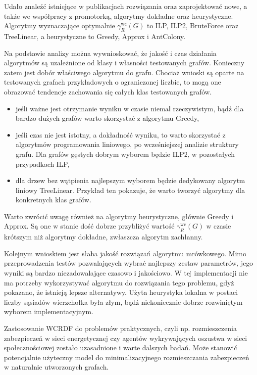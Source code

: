 Udało znaleźć istniejące w publikacjach rozwiązania oraz zaprojektować nowe, a także we współpracy z promotorką, algorytmy dokładne oraz heurystyczne. Algorytmy wyznaczające optymalnie $\gamma^{\text{wc}}_R(G)$ to ILP, ILP2, BruteForce oraz TreeLinear, a heurystyczne to Greedy, Approx i AntColony.

Na podstawie analizy można wywnioskować, że jakość i czas działania algorytmów są uzależnione od klasy i własności testowanych grafów. Konieczny zatem jest dobór właściwego algorytmu do grafu. Chociaż wnioski są oparte na testowanych grafach przykładowych o ograniczonej liczbie, to mogą one obrazować tendencje zachowania się całych klas testowanych grafów.
\begin{itemize}
    \item jeśli ważne jest otrzymanie wyniku w czasie niemal rzeczywistym, bądź dla bardzo dużych grafów warto skorzystać z algorytmu Greedy,
    \item jeśli czas nie jest istotny, a dokładność wyniku, to warto skorzystać z algorytmów programowania liniowego, po wcześniejszej analizie struktury grafu. Dla grafów gęstych dobrym wyborem będzie ILP2, w pozostałych przypadkach ILP,
    \item dla drzew bez wątpienia najlepszym wyborem będzie dedykowany algorytm liniowy TreeLinear. Przykład ten pokazuje, że warto tworzyć algorytmy dla konkretnych klas grafów.
\end{itemize}

Warto zwrócić uwagę również na algorytmy heurystyczne, głównie Greedy i Approx. Są one w stanie dość dobrze przybliżyć wartość $\gamma^{\text{wc}}_R(G)$ w czasie krótszym niż algorytmy dokładne, zwłaszcza algorytm zachłanny.

Kolejnym wnioskiem jest słaba jakość rozwiązań algorytmu mrówkowego. Mimo przeprowadzenia testów pozwalających wybrać najlepszy zestaw parametrów, jego wyniki są bardzo niezadowalające czasowo i jakościowo. W tej implementacji nie ma potrzeby wykorzystywać algorytmu do rozwiązania tego problemu, gdyż pokazano, że istnieją lepsze alternatywy. Użyta heurystyka lokalna w postaci liczby sąsiadów wierzchołka była złym, bądź niekoniecznie dobrze rozwiniętym wyborem implementacyjnym.

Zastosowanie WCRDF do problemów praktycznych, czyli np. rozmieszczenia zabezpieczeń w sieci energetycznej czy agentów wykrywających oszustwa w sieci społecznościowej zostało uzasadnione i warte dalszych badań. Może stanowić potencjalnie użyteczny model do minimalizacyjnego rozmieszczania zabezpieczeń w naturalnie utworzonych grafach.

